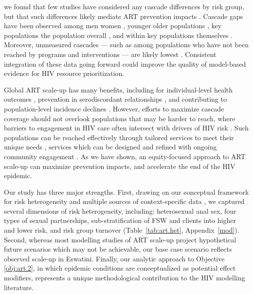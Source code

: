 we found that few studies have considered any cascade differences by risk group,
but that such differences likely mediate ART prevention impacts \cite{Knight2022sr}.
Cascade gaps have been observed among men \vs women \cite{Quinn2019,Green2020},
younger \vs older populations \cite{Green2020,Lebelonyane2021},
key populations \vs the population overall \cite{Hakim2018},
and within key populations themselves \cite{Mayanja2018,Jaffer2022}.
Moreover, unmeasured cascades
--- such as among populations who have not been reached by programs and interventions ---
are likely lowest \cite{Hakim2018,Boothe2021}.
Consistent integration of these data going forward could
improve the quality of model-based evidence for HIV resource prioritization.
\par
Global ART scale-up has many benefits, including for
individual-level health outcomes \cite{Gabillard2013,Lundgren2015init},
prevention in serodiscordant relationships \cite{Cohen2016},
and contributing to population-level incidence declines \cite{Havlir2020}.
However, efforts to maximize cascade coverage should not overlook
populations that may be harder to reach,
where barriers to engagement in HIV care often intersect with drivers of HIV risk
\cite{Wanyenze2016,Schwartz2017,Schmidt-Sane2022,Camlin2019,Baral2019}.
Such populations can be reached effectively through
tailored services to meet their unique needs \cite{Ehrenkranz2019},
services which can be designed and refined with ongoing community engagement
\cite{Chikwari2018,Mlambo2019,Comins2022}.
As we have shown, an equity-focused approach to ART scale-up can maximize prevention impacts,
and accelerate the end of the HIV epidemic.
\par
Our study has three major strengths.
First, drawing on our conceptual framework for risk heterogeneity \cite[Table~1]{Knight2022sr}
and multiple sources of context-specific data
\cite{SDHS2006,SHIMS1,SHIMS2,Baral2014,EswKP2014,EswIBBS2022},
we captured several dimensions of risk heterogeneity, including:
heterosexual anal sex,
four types of sexual partnerships,
sub-stratification of FSW and clients into higher and lower risk,
and risk group turnover
(Table~\ref{tab:art.het}, Appendix~\ref{mod}).
Second, whereas most modelling studies of ART scale-up
project hypothetical future scenarios which may not be achievable,
our base case scenario reflects observed scale-up in Eswatini.
Finally, our analytic approach to Objective \ref{obj:art.2},
in which epidemic conditions are conceptualized as potential effect modifiers,
represents a unique methodological contribution to the HIV modelling literature.
